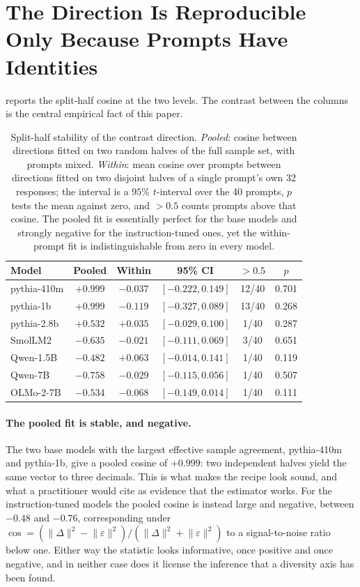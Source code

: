 \section{The Direction Is Reproducible Only Because Prompts Have Identities}
\label{sec:stability}

 reports the split-half cosine at the two levels. The contrast between the
columns is the central empirical fact of this paper.

\begin{table}[t]
\centering
\scriptsize
\setlength{\tabcolsep}{4pt}
\begin{tabular}{lccccc}
\toprule
Model & Pooled & Within & 95\% CI & $>0.5$ & $p$ \\
\midrule
pythia-410m  & $+0.999$ & $-0.037$ & $[-0.222, 0.149]$ & 12/40 & 0.701 \\
pythia-1b    & $+0.999$ & $-0.119$ & $[-0.327, 0.089]$ & 13/40 & 0.268 \\
pythia-2.8b  & $+0.532$ & $+0.035$ & $[-0.029, 0.100]$ & 1/40  & 0.287 \\
SmolLM2      & $-0.635$ & $-0.021$ & $[-0.111, 0.069]$ & 3/40  & 0.651 \\
Qwen-1.5B    & $-0.482$ & $+0.063$ & $[-0.014, 0.141]$ & 1/40  & 0.119 \\
Qwen-7B      & $-0.758$ & $-0.029$ & $[-0.115, 0.056]$ & 1/40  & 0.507 \\
OLMo-2-7B    & $-0.534$ & $-0.068$ & $[-0.149, 0.014]$ & 1/40  & 0.111 \\
\bottomrule
\end{tabular}
\caption{Split-half stability of the contrast direction. \emph{Pooled}: cosine between directions
fitted on two random halves of the full sample set, with prompts mixed. \emph{Within}: mean cosine
over prompts between directions fitted on two disjoint halves of a single prompt's own 32 responses;
the interval is a $95\%$ $t$-interval over the 40 prompts, $p$ tests the mean against zero, and
$>0.5$ counts prompts above that cosine. The pooled fit is essentially perfect for the base models
and strongly negative for the instruction-tuned ones, yet the within-prompt fit is indistinguishable
from zero in every model.}
\label{tab:stability}
\end{table}

\paragraph{The pooled fit is stable, and negative.}
The two base models with the largest effective sample agreement, pythia-410m and pythia-1b, give a
pooled cosine of $+0.999$: two independent halves yield the same vector to three decimals. This is
what makes the recipe look sound, and what a practitioner would cite as evidence that the estimator
works. For the instruction-tuned models the pooled cosine is instead large and negative, between
$-0.48$ and $-0.76$, corresponding under $\cos = (\lVert \Delta \rVert^2 - \lVert \varepsilon
\rVert^2)/(\lVert \Delta \rVert^2 + \lVert \varepsilon \rVert^2)$ to a signal-to-noise ratio
below one. Either way the statistic looks informative, once positive and once negative, and in
neither case does it license the inference that a diversity axis has been found.

